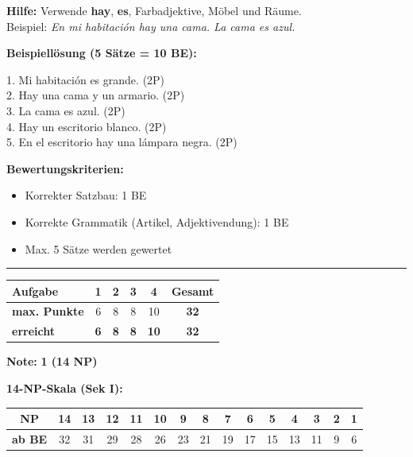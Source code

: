 \documentclass[11pt, a4paper]{article}
\newcommand{\fachfarbe}{spanisch}
\newcommand{\lsg}[1]{\textcolor{loesung}{\textbf{#1}}}
\newcommand{\es}[1]{\textcolor{\fachfarbe}{\textbf{#1}}}
\begin{document}
\begin{hintbox}
\textbf{Hilfe:} Verwende \es{hay}, \es{es}, Farbadjektive, Möbel und Räume. \\
Beispiel: \textit{En mi habitación hay una cama. La cama es azul.}
\end{hintbox}

\vspace{0.8em}

\noindent\lsg{Beispiellösung (5 Sätze = 10 BE):}

\vspace{0.5em}

\noindent\textcolor{loesung}{
1. Mi habitación es grande. (2P) \\
2. Hay una cama y un armario. (2P) \\
3. La cama es azul. (2P) \\
4. Hay un escritorio blanco. (2P) \\
5. En el escritorio hay una lámpara negra. (2P)
}

\vspace{0.8em}

\noindent\textbf{Bewertungskriterien:}
\begin{itemize}[leftmargin=2cm]
    \item Korrekter Satzbau: 1 BE
    \item Korrekte Grammatik (Artikel, Adjektivendung): 1 BE
    \item Max. 5 Sätze werden gewertet
\end{itemize}


\vspace{25pt}
\hrule
\vspace{10pt}

\noindent
\begin{tabularx}{\textwidth}{|X|c|c|c|c||c|}
\hline
\textbf{Aufgabe} & 1 & 2 & 3 & 4 & \textbf{Gesamt} \\
\hline
\textbf{max. Punkte} & 6 & 8 & 8 & 10 & \textbf{32} \\
\hline
\textbf{erreicht} & \lsg{6} & \lsg{8} & \lsg{8} & \lsg{10} & \lsg{32} \\
\hline
\end{tabularx}

\vspace{10pt}

\begin{flushright}
\textbf{Note:} \lsg{1 (14 NP)}
\end{flushright}

\vspace{1em}

\textbf{14-NP-Skala (Sek I):}

\begin{tabular}{|c|c|c|c|c|c|c|c|c|c|c|c|c|c|c|}
\hline
\textbf{NP} & 14 & 13 & 12 & 11 & 10 & 9 & 8 & 7 & 6 & 5 & 4 & 3 & 2 & 1 \\
\hline
\textbf{ab BE} & 32 & 31 & 29 & 28 & 26 & 23 & 21 & 19 & 17 & 15 & 13 & 11 & 9 & 6 \\
\hline
\end{tabular}
\end{document}
